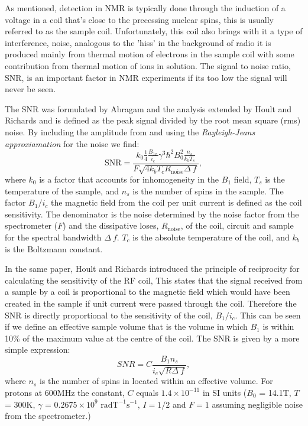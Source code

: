 As mentioned, detection in NMR is typically done through the induction of a voltage in a coil that's close
to the precessing nuclear spins, this is usually referred to as the sample coil. Unfortunately,
this coil also brings with it a type of interference, noise, analogous to the 'hiss' in the background
of radio it is produced mainly from thermal motion of electrons in the sample coil with some contribution from thermal
motion of ions in solution. The signal to noise ratio, SNR, is an important factor in NMR experiments if its too low
the signal will never be seen.

The SNR was formulated by Abragam\citep{Abragam:1961vg} and the analysis extended by Hoult and
Richards\citep{Hoult:1976dw} and is defined as the peak signal divided by the root mean square (rms) noise. By including
the amplitude from  and using the \textit{Rayleigh-Jeans approxiamation} for the noise we find:
\begin{equation}\label{eqn:SNR}
  \text{SNR} = \frac{k_0\frac{1}{4}\frac{B_{1x}}{i_c}\gamma^3\hbar^2B_0^2\frac{n_s}{k_bT_s}}{F\sqrt{4k_bT_cR_{\text{noise}}\Delta~f}},
\end{equation}
where $k_0$ is a factor that accounts for inhomogeneity in the $B_1$ field, $T_s$ is the
temperature of the sample, and $n_s$ is the number of spins in the sample. The factor $B_1/i_c$ the magnetic field from the coil per unit current is defined
as the coil sensitivity. The denominator is the noise determined by the noise factor from the spectrometer ($F$) and
the dissipative loses, $R_{\text{noise}}$, of the coil, circuit and sample for the spectral bandwidth $\Delta~f$.
$T_c$ is the absolute temperature of the coil, and $k_b$ is the Boltzmann constant.

In the same paper, Hoult and Richards introduced the principle of reciprocity for calculating the
sensitivity of the RF coil, This states that the signal received from a sample by a coil is proportional to the magnetic
field which would have been created in the sample if unit current were passed through the coil. Therefore the SNR is
directly proportional to the sensitivity of the coil, $B_1/i_c$. This can be seen if we define an
effective sample volume that is the volume in which $B_1$ is within 10\% of the maximum
value at the centre of the coil. The SNR is given by a more simple expression\citep{vanBentum:2007fda}:
\begin{equation}
  SNR = C\frac{B_1n_s}{i_c\sqrt{R\Delta~f}},
\end{equation}
where $n_s$ is the number of spins in located within an effective volume.
For protons at 600MHz the constant, $C$ equals $1.4\times10^{-11}$ in SI units ($B_0$ = 14.1T, $T$ = 300K, $\gamma$ =
$0.2675\times10^9$ $\text{rad} \text{T}^{-1}\text{s}^{-1}$, $I = 1/2$ and $F = 1$ assuming negligible noise from the spectrometer.)

